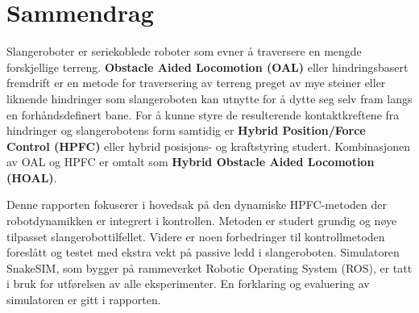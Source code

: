 \chapter{Sammendrag}




Slangeroboter er seriekoblede roboter som evner å traversere en mengde forskjellige terreng. \textbf{Obstacle Aided Locomotion (OAL)} eller hindringsbasert fremdrift er en metode for traversering av terreng preget av mye steiner eller liknende hindringer som slangeroboten kan utnytte for å dytte seg selv fram langs en forhåndsdefinert bane. For å kunne styre de resulterende kontaktkreftene fra hindringer og slangerobotens form samtidig er \textbf{Hybrid Position/Force Control (HPFC)} eller hybrid posisjons- og kraftstyring studert. Kombinasjonen av OAL og HPFC er omtalt som \textbf{Hybrid Obstacle Aided Locomotion (HOAL)}.

Denne rapporten fokuserer i hovedsak på den dynamiske HPFC-metoden der robotdynamikken er integrert i kontrollen. Metoden er studert grundig og nøye tilpasset slangerobottilfellet. Videre er noen forbedringer til kontrollmetoden foreslått og testet med ekstra vekt på passive ledd i slangeroboten.
Simulatoren SnakeSIM, som bygger på rammeverket Robotic Operating System (ROS), er tatt i bruk for utførelsen av alle eksperimenter. En forklaring og evaluering av simulatoren er gitt i rapporten.


